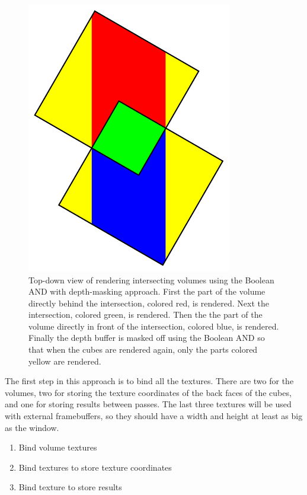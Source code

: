\documentclass{report}
\begin{document}
\begin{figure}
\centering
\includegraphics[width=0.8\textwidth]{boolean-and.pdf}
\caption{
Top-down view of rendering intersecting volumes using the Boolean AND with
depth-masking approach.  First the part of the volume directly behind the
intersection, colored red, is rendered.  Next the intersection, colored green,
is rendered.  Then the the part of the volume directly in front of the
intersection, colored blue, is rendered.  Finally the depth buffer is masked off
using the Boolean AND so that when the cubes are rendered again, only the parts
colored yellow are rendered.
}
\label{boolean-and}
\end{figure}

The first step in this approach is to bind all the textures.  There are two for
the volumes, two for storing the texture coordinates of the back faces of the
cubes, and one for storing results between passes.  The last three textures will
be used with external framebuffers, so they should have a width and height at
least as big as the window.

\begin{enumerate}
  \item Bind volume textures
  \item Bind textures to store texture coordinates
  \item Bind texture to store results
\end{enumerate}
\end{document}
